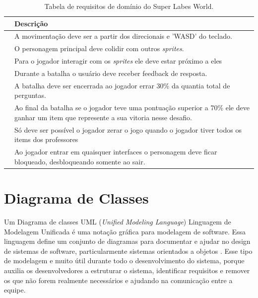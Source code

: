 \begin{table}[h!]
\begin{small}
\begin{tabular}{ | p{20mm} | p{102mm} | p{20mm} |}
		\end{tabular}
	\end{small}
\end{table}

\begin{table}[h!]
	\caption{Tabela de requisitos de domínio do Super Labes World.}
	\label{tbl-requisitos-de-dominio}
	\centering
	\renewcommand{\arraystretch}{2}
	\begin{small}
		\begin{tabular}{ | p{20mm} | p{122mm} | }\hline \rowcolor{MidnightBlue}
			\centering{\textbf{Id}} & \textbf{Descrição} \\\hline
                \centering{RN1} & A movimentação deve ser a partir dos direcionais e 'WASD' do teclado.\\\hline
			\centering{RN2} & O personagem principal deve colidir com outros \textit{sprites}.  \\\hline
			\centering{RN3} & Para o jogador interagir com os \textit{sprites} ele deve estar próximo a eles \\\hline
                \centering{RN4} & Durante a batalha o usuário deve receber feedback de resposta.  \\\hline
			\centering{RN5} & A batalha deve ser encerrada ao jogador errar 30\% da quantia total de perguntas.  \\\hline
			\centering{RN6} & Ao final da batalha se o jogador teve uma pontuação superior a 70\% ele deve ganhar um item que represente a sua vitoria nesse desafio.  \\\hline
			\centering{RN7} & Só deve ser possível o jogador zerar o jogo quando o jogador tiver todos os items dos professores  \\\hline
			\centering{RN8} & Ao jogador entrar em quaisquer interfaces o personagem deve ficar bloqueado, desbloqueando somente ao sair.  \\\hline


		\end{tabular}
	\end{small}
\end{table}


\clearpage
\section{Diagrama de Classes}
\label{sec:diagrama-de-classes}
Um Diagrama de classes UML (\textit{Unified Modeling Language}) Linguagem de Modelagem Unificada é uma notação gráfica para modelagem de software. Essa linguagem define um conjunto de diagramas para documentar e ajudar no design de sistemas de software, particularmente sistemas orientados a objetos \cite{engsoftmoderna}. Esse tipo de modelagem e muito útil durante todo o desenvolvimento do sistema, porque auxilia os desenvolvedores a estruturar o sistema, identificar requisitos e remover os que não forem realmente necessários e ajudando na comunicação entre a equipe.

